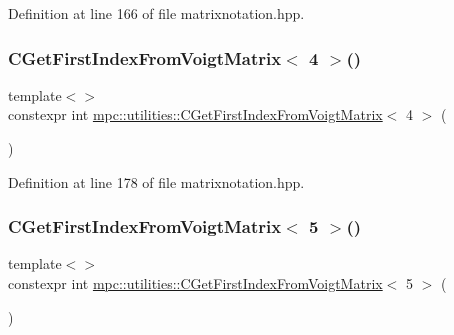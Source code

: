 Definition at line 166 of file matrixnotation.\+hpp.

\mbox{\label{namespacempc_1_1utilities_a9cc9cf00e8b46c7b4089290a9801dab8}} 
\subsubsection{\texorpdfstring{C\+Get\+First\+Index\+From\+Voigt\+Matrix$<$ 4 $>$()}{CGetFirstIndexFromVoigtMatrix< 4 >()}}
{\footnotesize\ttfamily template$<$$>$ \\
constexpr int \mbox{\hyperlink{namespacempc_1_1utilities_acb1091d4fd58c0821eeeba68a43146ac}{mpc\+::utilities\+::\+C\+Get\+First\+Index\+From\+Voigt\+Matrix}}$<$ 4 $>$ (\begin{DoxyParamCaption}{ }\end{DoxyParamCaption})\hspace{0.3cm}{\ttfamily [inline]}}



Definition at line 178 of file matrixnotation.\+hpp.

\mbox{\label{namespacempc_1_1utilities_a84defb8639ca919a8620092ce15ffd4c}} 
\subsubsection{\texorpdfstring{C\+Get\+First\+Index\+From\+Voigt\+Matrix$<$ 5 $>$()}{CGetFirstIndexFromVoigtMatrix< 5 >()}}
{\footnotesize\ttfamily template$<$$>$ \\
constexpr int \mbox{\hyperlink{namespacempc_1_1utilities_acb1091d4fd58c0821eeeba68a43146ac}{mpc\+::utilities\+::\+C\+Get\+First\+Index\+From\+Voigt\+Matrix}}$<$ 5 $>$ (\begin{DoxyParamCaption}{ }\end{DoxyParamCaption})\hspace{0.3cm}{\ttfamily [inline]}}



